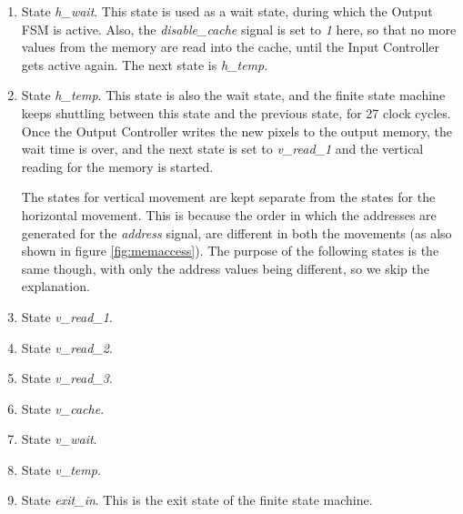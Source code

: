 \documentclass[11pt,a4paper]{article}
\begin{document}
\begin{enumerate}
\item State \textit{h\_wait}. This state is used as a wait state, during which the Output FSM is active. Also, the \textit{disable\_cache} signal is set to \textit{1} here, so that no more values from the memory are read into the cache, until the Input Controller gets active again. The next state is \textit{h\_temp}.

\item State \textit{h\_temp}. This state is also the wait state, and the finite state machine keeps shuttling between this state and the previous state, for 27 clock cycles. Once the Output Controller writes the new pixels to the output memory, the wait time is over, and the next state is set to \textit{v\_read\_1} and the vertical reading for the memory is started.

The states for vertical movement are kept separate from the states for the horizontal movement. This is because the order in which the addresses are generated for the \textit{address} signal, are different in both the movements (as also shown in figure \ref{fig:memaccess}). The purpose of the following states is the same though, with only the address values being different, so we skip the explanation.
\item State \textit{v\_read\_1}. 

\item State \textit{v\_read\_2}. 

\item State \textit{v\_read\_3}. 

\item State \textit{v\_cache}. 

\item State \textit{v\_wait}. 

\item State \textit{v\_temp}.

\item State \textit{exit\_in}. This is the exit state of the finite state machine.

\end{enumerate}
\end{document}
